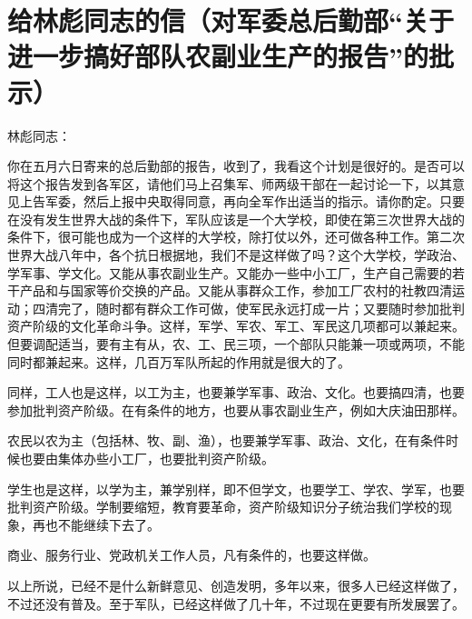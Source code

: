 \section[给林彪同志的信（对军委总后勤部“关于进一步搞好部队农副业生产的报告”的批示）（一九六六年五月七日）]{给林彪同志的信（对军委总后勤部“关于进一步搞好部队农副业生产的报告”的批示）}


林彪同志：

你在五月六日寄来的总后勤部的报告，收到了，我看这个计划是很好的。是否可以将这个报告发到各军区，请他们马上召集军、师两级干部在一起讨论一下，以其意见上告军委，然后上报中央取得同意，再向全军作出适当的指示。请你酌定。只要在没有发生世界大战的条件下，军队应该是一个大学校，即使在第三次世界大战的条件下，很可能也成为一个这样的大学校，除打仗以外，还可做各种工作。第二次世界大战八年中，各个抗日根据地，我们不是这样做了吗？这个大学校，学政治、学军事、学文化。又能从事农副业生产。又能办一些中小工厂，生产自己需要的若干产品和与国家等价交换的产品。又能从事群众工作，参加工厂农村的社教四清运动；四清完了，随时都有群众工作可做，使军民永远打成一片；又要随时参加批判资产阶级的文化革命斗争。这样，军学、军农、军工、军民这几项都可以兼起来。但要调配适当，要有主有从，农、工、民三项，一个部队只能兼一项或两项，不能同时都兼起来。这样，几百万军队所起的作用就是很大的了。

同样，工人也是这样，以工为主，也要兼学军事、政治、文化。也要搞四清，也要参加批判资产阶级。在有条件的地方，也要从事农副业生产，例如大庆油田那样。

农民以农为主（包括林、牧、副、渔），也要兼学军事、政治、文化，在有条件时候也要由集体办些小工厂，也要批判资产阶级。

学生也是这样，以学为主，兼学别样，即不但学文，也要学工、学农、学军，也要批判资产阶级。学制要缩短，教育要革命，资产阶级知识分子统治我们学校的现象，再也不能继续下去了。

商业、服务行业、党政机关工作人员，凡有条件的，也要这样做。

以上所说，已经不是什么新鲜意见、创造发明，多年以来，很多人已经这样做了，不过还没有普及。至于军队，已经这样做了几十年，不过现在更要有所发展罢了。



